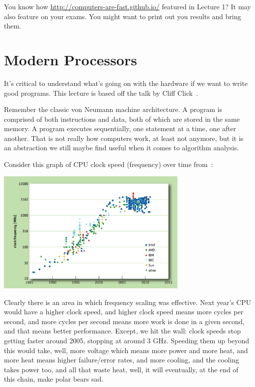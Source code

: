 




You know how \url{http://computers-are-fast.github.io/} featured in Lecture 1? It may also feature on your exams. You might want to print out you results and bring them.

\section*{Modern Processors}

It's critical to understand what's going on with the hardware if we want to write good programs. This lecture is based off the talk by Cliff Click~\cite{modern-hardware}.

Remember the classic von Neumann machine architecture. A program is comprised of both instructions and data, both of which are stored in the same memory. A program executes sequentially, one statement at a time, one after another. That is not really how computers work, at least not anymore, but it is an abstraction we still maybe find useful when it comes to algorithm analysis.

Consider this graph of CPU clock speed (frequency) over time from~\cite{cpudb}:

\begin{center}
\includegraphics[width=0.7\textwidth]{images/cpu-frequency}
\end{center}

Clearly there is an area in which frequency scaling was effective. Next year's CPU would have a higher clock speed, and higher clock speed means more cycles per second, and more cycles per second means more work is done in a given second, and that means better performance. Except, we hit the wall: clock speeds stop getting faster around 2005, stopping at around 3 GHz. Speeding them up beyond this would take, well, more voltage which means more power and more heat, and more heat means higher failure/error rates, and more cooling, and the cooling takes power too, and all that waste heat, well, it will eventually, at the end of this chain, make polar bears sad.

